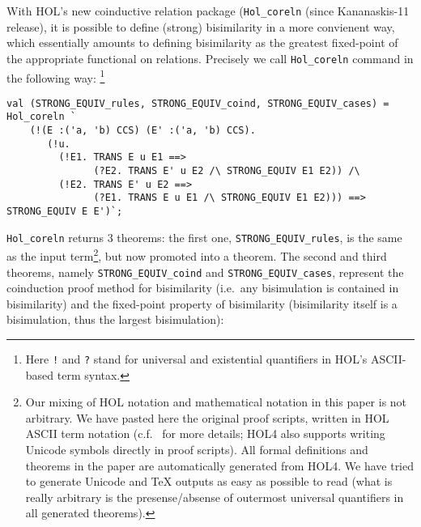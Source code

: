 With HOL's
new coinductive relation package (\texttt{Hol_coreln} (since Kananaskis-11 release),
it is possible to define (strong) bisimilarity in a more convienent way, which
essentially amounts to defining bisimilarity as the greatest
fixed-point of the appropriate functional on relations. Precisely we call 
\texttt{Hol_coreln} command in the following way:%
\footnote{Here {\tt !} and {\tt ?} stand for universal and
existential quantifiers in HOL's ASCII-based term syntax.}
\begin{lstlisting}
val (STRONG_EQUIV_rules, STRONG_EQUIV_coind, STRONG_EQUIV_cases) = Hol_coreln `
    (!(E :('a, 'b) CCS) (E' :('a, 'b) CCS).
       (!u.
         (!E1. TRANS E u E1 ==>
               (?E2. TRANS E' u E2 /\ STRONG_EQUIV E1 E2)) /\
         (!E2. TRANS E' u E2 ==>
               (?E1. TRANS E u E1 /\ STRONG_EQUIV E1 E2))) ==> STRONG_EQUIV E E')`;
\end{lstlisting}
\texttt{Hol_coreln} returns 3 theorems: the first one,
\texttt{STRONG_EQUIV_rules}, is the
same as the input term\footnote{Our mixing of HOL notation and mathematical
  notation in this paper is not arbitrary.
We have  pasted here the
    original proof scripts,  written in HOL ASCII term
  notation (c.f.\  \cite{holdesc} for more details; HOL4 also supports writing Unicode symbols directly in
  proof scripts). All formal definitions and
  theorems in the paper are automatically generated from HOL4. We have
  tried to  generate
  Unicode and TeX outputs as easy  as possible to read (what is really
  arbitrary is the presense/absense of outermost universal
  quantifiers in all generated theorems).}, but now promoted into a theorem.
The second and third theorems, namely \texttt{STRONG_EQUIV_coind} and \texttt{STRONG_EQUIV_cases},
represent the coinduction proof method for bisimilarity 
(i.e.~any bisimulation is contained in bisimilarity)
and the fixed-point property of bisimilarity
(bisimilarity itself is a bisimulation, thus the largest
bisimulation):
